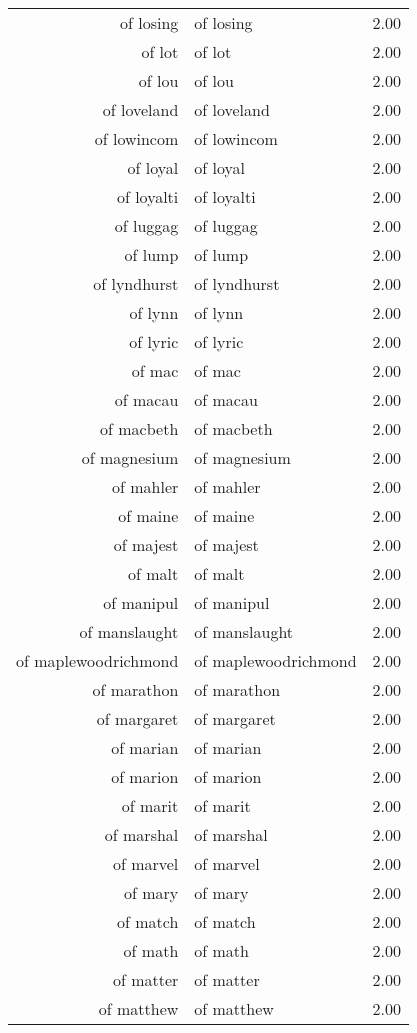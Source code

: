 \begin{table}[ht]
\begin{tabular}{rlr}
  of losing & of losing & 2.00 \\ 
  of lot & of lot & 2.00 \\ 
  of lou & of lou & 2.00 \\ 
  of loveland & of loveland & 2.00 \\ 
  of lowincom & of lowincom & 2.00 \\ 
  of loyal & of loyal & 2.00 \\ 
  of loyalti & of loyalti & 2.00 \\ 
  of luggag & of luggag & 2.00 \\ 
  of lump & of lump & 2.00 \\ 
  of lyndhurst & of lyndhurst & 2.00 \\ 
  of lynn & of lynn & 2.00 \\ 
  of lyric & of lyric & 2.00 \\ 
  of mac & of mac & 2.00 \\ 
  of macau & of macau & 2.00 \\ 
  of macbeth & of macbeth & 2.00 \\ 
  of magnesium & of magnesium & 2.00 \\ 
  of mahler & of mahler & 2.00 \\ 
  of maine & of maine & 2.00 \\ 
  of majest & of majest & 2.00 \\ 
  of malt & of malt & 2.00 \\ 
  of manipul & of manipul & 2.00 \\ 
  of manslaught & of manslaught & 2.00 \\ 
  of maplewoodrichmond & of maplewoodrichmond & 2.00 \\ 
  of marathon & of marathon & 2.00 \\ 
  of margaret & of margaret & 2.00 \\ 
  of marian & of marian & 2.00 \\ 
  of marion & of marion & 2.00 \\ 
  of marit & of marit & 2.00 \\ 
  of marshal & of marshal & 2.00 \\ 
  of marvel & of marvel & 2.00 \\ 
  of mary & of mary & 2.00 \\ 
  of match & of match & 2.00 \\ 
  of math & of math & 2.00 \\ 
  of matter & of matter & 2.00 \\ 
  of matthew & of matthew & 2.00 \\ 

\end{tabular}
\end{table}
